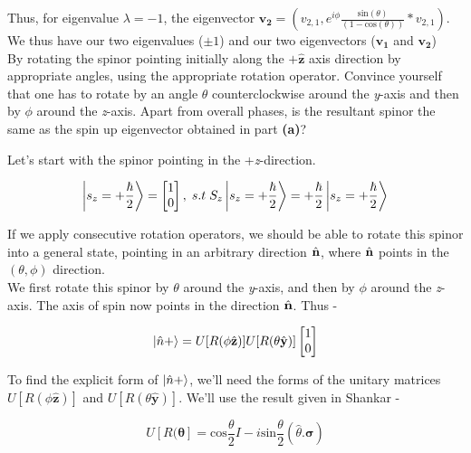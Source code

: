 \begin{alphaparts}
Thus, for eigenvalue $\lambda = -1$, the eigenvector $\mathbf{v_{2}} = (v_{2,1}, e^{i\phi}\frac{\textrm{sin}(\theta)}{(1 - \textrm{cos}(\theta))}*v_{2,1})$.\\
We thus have our two eigenvalues ($\pm 1$) and our two eigenvectors ($\mathbf{v_{1}}$ and $\mathbf{v_{2}}$) \\

\questionpart By rotating the spinor pointing initially along the $+\hat{\mathbf{z}}$ axis direction by appropriate angles, u\textrm{sin}g the appropriate rotation operator. Convince yourself that one has to rotate by an angle $\theta$ counterclockwise around the \textit{y}-axis and then by $\phi$ around the \textit{z}-axis. Apart from overall phases, is the resultant spinor the same as the spin up eigenvector obtained in part \textbf{(a)}? 

Let's start with the spinor pointing in the +\textit{z}-direction.

\begin{equation*}
    \ket{s_{z} = +\frac{\hbar}{2}} = 
    \begin{bmatrix}
        1 \\
        0
    \end{bmatrix}, \; s.t \;  S_{z}\ket{s_{z} = +\frac{\hbar}{2}} = +\frac{\hbar}{2}\ket{s_{z} = +\frac{\hbar}{2}}
\end{equation*}

If we apply consecutive rotation operators, we should be able to rotate this spinor into a general state, pointing in an arbitrary direction $\hat{\textbf{n}}$, where $\hat{\textbf{n}}$ points in the $(\theta, \phi)$ direction. \\
We first rotate this spinor by $\theta$ around the \textit{y}-axis, and then by $\phi$ around the \textit{z}-axis. The axis of spin now points in the direction $\hat{\textbf{n}}$. Thus - 

\begin{equation*}
    \ket{\hat{n}+} = U[R(\phi\hat{\mathbf{z}})]U[R(\theta\hat{\mathbf{y}})]
    \begin{bmatrix}
        1 \\
        0
    \end{bmatrix}
\end{equation*}

To find the explicit form of $\ket{\hat{n}+}$, we'll need the forms of the unitary matrices $U[R(\phi\hat{\mathbf{z}})]$ and $U[R(\theta\hat{\mathbf{y}})]$. We'll use the result given in Shankar - 

\begin{equation*}
        U[R(\boldsymbol{\theta}] = \textrm{cos}\frac{\theta}{2}I - i\textrm{sin}\frac{\theta}{2}(\hat{\theta}.\boldsymbol{\sigma})
\end{equation*}


\end{alphaparts}
